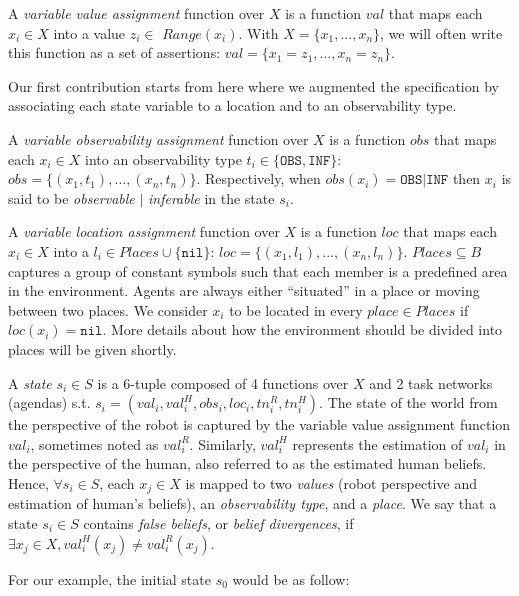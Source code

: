 A \textit{variable value assignment} function over $X$ is a function $val$ that maps each $x_i \in X$ into a value $z_i \in$ $\textit{Range}(x_i)$. With $X = \{ x_1, ..., x_n \}$, we will often write this function as a set of assertions: $val = \{ x_1=z_1, \ldots, x_n=z_n \}$. 

Our first contribution starts from here where we augmented the specification by associating each state variable to a location and to an observability type.

A \textit{variable observability assignment} function over $X$ is a function $obs$ that maps each $x_i \in X$ into an observability type $t_i \in \{ \texttt{OBS},  \texttt{INF} \}$: $obs = \{ (x_1,t_1), \ldots , (x_n,t_n) \}$. Respectively, when $obs(x_i) = \texttt{OBS} | \texttt{INF}$ then $x_i$ is said to be \textit{observable} $|$ \textit{inferable} in the state $s_i$.

A \textit{variable location assignment} function over $X$ is a function $loc$ that maps each $x_i \in X$ into a $l_i \in Places \cup \{ \texttt{nil} \}$: $loc = \{ (x_1,l_1), ..., (x_n,l_n) \}$. 
$Places \subseteq B$ captures a group of constant symbols such that each member is a predefined area in the environment. 
Agents are always either ``situated'' in a place or moving between two places. 
We consider $x_i$ to be located in every $place \in Places$ if $loc(x_i)=\texttt{nil}$. 
More details about how the environment should be divided into places will be given shortly.

A \textit{state} $s_i \in S$ is a 6-tuple composed of 4 functions over $X$ and 2 task networks (agendas)  s.t. $s_i = (val_i, val^H_i, obs_i, loc_i, tn^R_i, tn^H_i)$. 
The state of the world from the perspective of the robot is captured by the variable value assignment function $val_i$, sometimes noted as $val^R_i$. 
Similarly, $val^H_i$ represents the estimation of $val_i$ in the perspective of the human, also referred to as the estimated human beliefs. 
Hence, $\forall s_i \in S$, each $x_j \in X$ is  mapped to two \textit{values} (robot perspective and estimation of human's beliefs), an \textit{observability type}, and a \textit{place}. We say that a state $s_i \in S$ contains \textit{false beliefs}, or \textit{belief divergences}, if $\exists x_j \in X, val^H_i(x_j) \neq val^R_i(x_j)$. 

For our example, the initial state $s_0$ would be as follow: 

\newcommand{\smallvspace}{\vspace{-0.8cm}}
\newcommand{\bigvspace}{\vspace{-1.3cm}}

